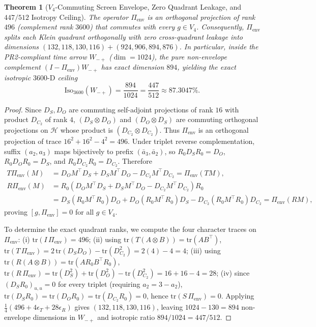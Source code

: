 \documentclass[11pt,a4paper]{article}
\renewcommand{\_}{\origunderscore\penalty200\relax}
\newtheorem{theorem}{Theorem}[section]
\theoremstyle{remark}
\begin{document}
\begin{theorem}[$V_4$-Commuting Screen Envelope, Zero Quadrant Leakage, and $447/512$ Isotropy Ceiling]
\label{thm:env496}
The operator $\Pi_{\mathrm{env}}$ is an orthogonal projection of rank $496$ (complement rank $3600$) that commutes with every $g \in V_4$.
Consequently, $\Pi_{\mathrm{env}}$ splits each Klein quadrant orthogonally with zero cross-quadrant leakage into dimensions $(132, 118, 130, 116) + (924, 906, 894, 876)$.
In particular, inside the PR2-compliant time arrow $W_{-+}$ ($\dim = 1024$), the pure non-envelope complement $(I - \Pi_{\mathrm{env}})W_{-+}$ has exact dimension $894$, yielding the exact isotropic $3600\text{-D}$ ceiling
\begin{equation}
\mathrm{Iso}_{3600}(W_{-+}) = \frac{894}{1024} = \frac{447}{512} \approx 87.3047\%.
\end{equation}
\end{theorem}

\begin{proof}
Since $D_S, D_O$ are commuting self-adjoint projections of rank $16$ with product $D_{C_2}$ of rank $4$, $(D_S \otimes D_O)$ and $(D_O \otimes D_S)$ are commuting orthogonal projections on $\mathcal{H}$ whose product is $(D_{C_2} \otimes D_{C_2})$.
Thus $\Pi_{\mathrm{env}}$ is an orthogonal projection of trace $16^2 + 16^2 - 4^2 = 496$.
Under triplet reverse complementation, suffix $(a_2,a_3)$ maps bijectively to prefix $(\bar{a}_3,\bar{a}_2)$, so $R_0 D_S R_0 = D_O$, $R_0 D_O R_0 = D_S$, and $R_0 D_{C_2} R_0 = D_{C_2}$.
Therefore
\begin{align*}
T\Pi_{\mathrm{env}}(M) &= D_O M^\top D_S + D_S M^\top D_O - D_{C_2} M^\top D_{C_2} = \Pi_{\mathrm{env}}(TM),\\
R\Pi_{\mathrm{env}}(M) &= R_0 (D_O M^\top D_S + D_S M^\top D_O - D_{C_2} M^\top D_{C_2}) R_0 \\
&= D_S (R_0 M^\top R_0) D_O + D_O (R_0 M^\top R_0) D_S - D_{C_2} (R_0 M^\top R_0) D_{C_2} = \Pi_{\mathrm{env}}(RM),
\end{align*}
proving $[g, \Pi_{\mathrm{env}}] = 0$ for all $g \in V_4$.

To determine the exact quadrant ranks, we compute the four character traces on $\Pi_{\mathrm{env}}$:
(i) $\mathrm{tr}(I\,\Pi_{\mathrm{env}}) = 496$;
(ii) using $\mathrm{tr}(T(A \otimes B)) = \mathrm{tr}(AB^\top)$, $\mathrm{tr}(T\,\Pi_{\mathrm{env}}) = 2\,\mathrm{tr}(D_S D_O) - \mathrm{tr}(D_{C_2}^2) = 2(4) - 4 = 4$;
(iii) using $\mathrm{tr}(R(A \otimes B)) = \mathrm{tr}(A R_0 B^\top R_0)$, $\mathrm{tr}(R\,\Pi_{\mathrm{env}}) = \mathrm{tr}(D_S^2) + \mathrm{tr}(D_O^2) - \mathrm{tr}(D_{C_2}^2) = 16 + 16 - 4 = 28$;
(iv) since $(D_S R_0)_{u,u} = 0$ for every triplet (requiring $a_2 = 3 - a_2$), $\mathrm{tr}(D_S R_0) = \mathrm{tr}(D_O R_0) = \mathrm{tr}(D_{C_2} R_0) = 0$, hence $\mathrm{tr}(S\,\Pi_{\mathrm{env}}) = 0$.
Applying $\frac{1}{4}(496 + 4\epsilon_T + 28\epsilon_R)$ gives $(132, 118, 130, 116)$, leaving $1024 - 130 = 894$ non-envelope dimensions in $W_{-+}$ and isotropic ratio $894/1024 = 447/512$.
\end{proof}
\end{document}
